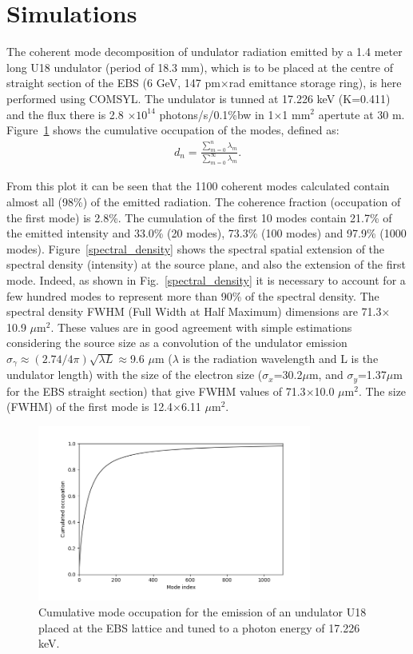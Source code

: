 \documentclass{iucr}              %
\newcommand{\inblue}[1]{{\color{blue}#1}}
\begin{document}
\section{Simulations}

The coherent mode decomposition of undulator radiation emitted by a 1.4 meter long U18 undulator (period of 18.3 mm), which is to be placed at the centre of straight section of the EBS (6 GeV, 147 pm$\times$rad emittance storage ring), is here performed using COMSYL. The undulator is tunned at 17.226 keV (K=0.411) and the flux there is 2.8 $\times 10^{14}$ photons/s/0.1\%bw in 1$\times$1 mm$^2$ apertute at 30 m. \inblue{Figure~\ref{cumulative_mode_occupation}} shows the cumulative occupation of the modes, defined as: 
\begin{equation}
\begin{aligned}
\label{spectrum}
d_n=\frac{\sum_{m=0}^{n} \lambda_m}{\sum_{m=0}^{\infty} \lambda_m}.
\end{aligned}
\end{equation}

From this plot it can be seen that the 1100 coherent modes calculated contain almost all (98\%) of the emitted radiation. The coherence fraction (occupation of the first mode) is 2.8\%. The cumulation of the first 10 modes contain 21.7\% of the emitted intensity and 33.0\% (20 modes), 73.3\% (100 modes) and 97.9\% (1000 modes). 
\inblue{Figure~\ref{spectral_density}} shows the spectral spatial extension of the spectral density (intensity) at the source plane, and also the extension of the first mode.
Indeed, as shown in \inblue{Fig.~\ref{spectral_density}} it is necessary to account for a few hundred modes to represent more than 90\% of the spectral density. The spectral density FWHM (Full Width at Half Maximum) dimensions are 71.3$\times$10.9 $\mu$m$^2$. These values are in good agreement with simple estimations considering the source size as a convolution of the undulator emission $\sigma_\gamma\approx (2.74/4\pi) \sqrt{\lambda L}\approx$9.6 $\mu$m ($\lambda$ is the radiation wavelength and L is the undulator length) with the size of the electron size ($\sigma_x$=30.2$\mu$m, and $\sigma_y$=1.37$\mu$m for the EBS straight section) that give FWHM values of 71.3$\times$10.0 $\mu$m$^2$. The size (FWHM) of the first mode is 12.4$\times$6.11 $\mu$m$^2$.  

\begin{figure}\label{cumulative_mode_occupation}
\caption{Cumulative mode occupation for the emission of an undulator U18 placed at the EBS lattice and tuned to a photon energy of 17.226 keV.}
\includegraphics[width=9.0cm]{Figures/vx_cumulated.png}
\end{figure}
\end{document}
